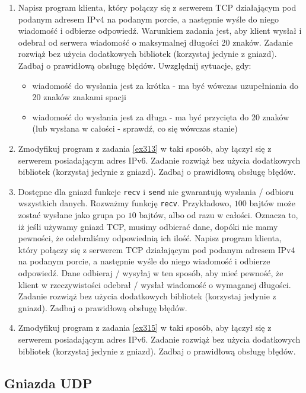 \documentclass{article}
\begin{document}
\begin{enumerate}[label=\textbf{3.\arabic*}]
    \item \label{ex313} Napisz program klienta, który połączy się z serwerem TCP działającym pod podanym adresem IPv4 na podanym porcie, a następnie wyśle do niego wiadomość i odbierze odpowiedź. Warunkiem zadania jest, aby klient wysłał i odebrał od serwera wiadomość o maksymalnej długości 20 znaków. Zadanie rozwiąż bez użycia dodatkowych bibliotek (korzystaj jedynie z gniazd). Zadbaj o prawidłową obsługę błędów.  Uwzględnij sytuacje, gdy:
    \begin{itemize}
    \item wiadomość do wysłania jest za krótka - ma być wówczas uzupełniania do 20 znaków znakami spacji
    \item wiadomość do wysłania jest za długa - ma być przycięta do 20 znaków (lub wysłana w całości - sprawdź, co się wówczas stanie)
    \end{itemize}
    
    \item Zmodyfikuj program z zadania \ref{ex313} w taki sposób,  aby łączył się z serwerem posiadającym adres IPv6. Zadanie rozwiąż bez użycia dodatkowych bibliotek (korzystaj jedynie z gniazd). Zadbaj o prawidłową obsługę błędów. 
    
    \item \label{ex315} Dostępne dla gniazd funkcje \texttt{recv} i \texttt{send} nie gwarantują wysłania / odbioru wszystkich danych. Rozważmy funkcję \texttt{recv}. Przykładowo, $100$ bajtów może zostać wysłane jako grupa po $10$ bajtów, albo od razu w całości. Oznacza to, iż jeśli używamy gniazd TCP, musimy odbierać dane, dopóki nie mamy pewności, że odebraliśmy odpowiednią ich ilość. Napisz program klienta, który połączy się z serwerem TCP działającym pod podanym adresem IPv4 na podanym porcie, a następnie wyśle do niego wiadomość i odbierze odpowiedź. Dane odbieraj / wysyłaj w ten sposób, aby mieć pewność, że klient w rzeczywistości odebrał / wysłał wiadomość o wymaganej długości. Zadanie rozwiąż bez użycia dodatkowych bibliotek (korzystaj jedynie z gniazd). Zadbaj o prawidłową obsługę błędów. 
    
    \item Zmodyfikuj program z zadania \ref{ex315} w taki sposób,  aby łączył się z serwerem posiadającym adres IPv6. Zadanie rozwiąż bez użycia dodatkowych bibliotek (korzystaj jedynie z gniazd). Zadbaj o prawidłową obsługę błędów. 
   
\end{enumerate}

\subsection*{Gniazda UDP}
\end{document}
